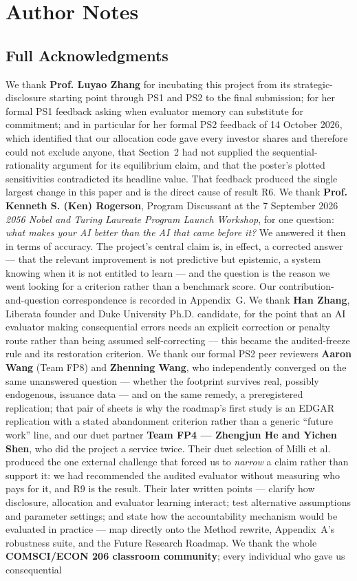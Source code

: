 \clearpage\balance
\section*{Author Notes}
\subsection*{Full Acknowledgments}
We thank \textbf{Prof. Luyao Zhang} for incubating this project from its strategic-disclosure starting point through PS1 and PS2 to the final submission; for her formal PS1 feedback asking when evaluator memory can substitute for commitment; and in particular for her formal PS2 feedback of 14 October 2026, which identified that our allocation code gave every investor shares and therefore could not exclude anyone, that Section~2 had not supplied the sequential-rationality argument for its equilibrium claim, and that the poster's plotted sensitivities contradicted its headline value. That feedback produced the single largest change in this paper and is the direct cause of result R6. We thank \textbf{Prof. Kenneth S. (Ken) Rogerson}, Program Discussant at the 7 September 2026 \emph{2056 Nobel and Turing Laureate Program Launch Workshop}, for one question: \emph{what makes your AI better than the AI that came before it?} We answered it then in terms of accuracy. The project's central claim is, in effect, a corrected answer --- that the relevant improvement is not predictive but epistemic, a system knowing when it is not entitled to learn --- and the question is the reason we went looking for a criterion rather than a benchmark score. Our contribution-and-question correspondence is recorded in Appendix~G. We thank \textbf{Han Zhang}, Liberata founder and Duke University Ph.D. candidate, for the point that an AI evaluator making consequential errors needs an explicit correction or penalty route rather than being assumed self-correcting --- this became the audited-freeze rule and its restoration criterion. We thank our formal PS2 peer reviewers \textbf{Aaron Wang} (Team FP8) and \textbf{Zhenning Wang}, who independently converged on the same unanswered question --- whether the footprint survives real, possibly endogenous, issuance data --- and on the same remedy, a preregistered replication; that pair of sheets is why the roadmap's first study is an EDGAR replication with a stated abandonment criterion rather than a generic ``future work'' line, and our duet partner \textbf{Team FP4 --- Zhengjun He and Yichen Shen}, who did the project a service twice. Their duet selection of Milli et al.~\cite{milli2019} produced the one external challenge that forced us to \emph{narrow} a claim rather than support it: we had recommended the audited evaluator without measuring who pays for it, and R9 is the result. Their later written points --- clarify how disclosure, allocation and evaluator learning interact; test alternative assumptions and parameter settings; and state how the accountability mechanism would be evaluated in practice --- map directly onto the Method rewrite, Appendix~A's robustness suite, and the Future Research Roadmap. We thank the whole \textbf{COMSCI/ECON 206 classroom community}; every individual who gave us consequential 